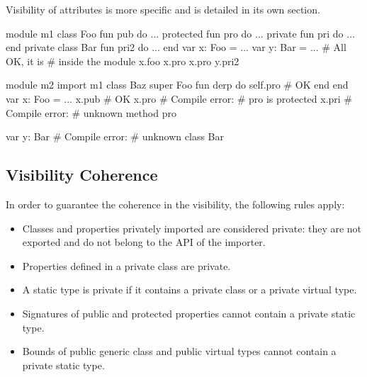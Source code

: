 Visibility of attributes is more specific and is detailed in its own section.

\begin{multicols}{2}
\begin{lst}
module m1
class Foo
	fun pub do ...
	protected fun pro
	do ...
	private fun pri
	do ...
end
private class Bar
	fun pri2 do ...
end
var x: Foo = ...
var y: Bar = ...
# All OK, it is
# inside the module
x.foo
x.pro
x.pro
y.pri2
\end{lst}
\columnbreak
\begin{lst}
module m2
import m1
class Baz
	super Foo
	fun derp
	do
		self.pro # OK
	end
end
var x: Foo = ...
x.pub # OK
x.pro # Compile error:
      # pro is protected
x.pri # Compile error:
      # unknown method pro

var y: Bar
# Compile error:
# unknown class Bar
\end{lst}
\end{multicols}

\subsection{Visibility Coherence}

In order to guarantee the coherence in the visibility, the following rules apply:
\begin{itemize}
\item Classes and properties privately imported are considered private: they are not exported and do not belong to the API of the importer.
\item Properties defined in a private class are private.
\item A static type is private if it contains a private class or a private virtual type.
\item Signatures of public and protected properties cannot contain a private static type.
\item Bounds of public generic class and public virtual types cannot contain a private static type.
\end{itemize}


